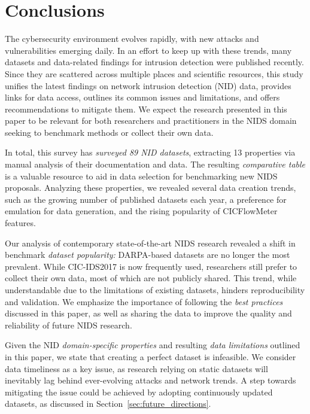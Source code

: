 
\section{Conclusions}
\label{sec:conclusions}

The cybersecurity environment evolves rapidly, with new attacks and vulnerabilities emerging daily. In an effort to keep up with these trends, many datasets and data-related findings for intrusion detection were published recently. Since they are scattered across multiple places and scientific resources, this study unifies the latest findings on network intrusion detection (NID) data, provides links for data access, outlines its common issues and limitations, and offers recommendations to mitigate them. We expect the research presented in this paper to be relevant for both researchers and practitioners in the NIDS domain seeking to benchmark methods or collect their own data.

In total, this survey has \emph{surveyed 89 NID datasets}, extracting 13 properties via manual analysis of their documentation and data. The resulting \emph{comparative table} is a valuable resource to aid in data selection for benchmarking new NIDS proposals. Analyzing these properties, we revealed several data creation trends, such as the growing number of published datasets each year, a preference for emulation for data generation, and the rising popularity of CICFlowMeter features.

Our analysis of contemporary state-of-the-art NIDS research revealed a shift in benchmark \emph{dataset popularity:} DARPA-based datasets are no longer the most prevalent. While CIC-IDS2017 is now frequently used, researchers still prefer to collect their own data, most of which are not publicly shared. This trend, while understandable due to the limitations of existing datasets, hinders reproducibility and validation. We emphasize the importance of following the \emph{best practices} discussed in this paper, as well as sharing the data to improve the quality and reliability of future NIDS research.

Given the NID \emph{domain-specific properties} and resulting \emph{data limitations} outlined in this paper, we state that creating a perfect dataset is infeasible. We consider data timeliness as a key issue, as research relying on static datasets will inevitably lag behind ever-evolving attacks and network trends. A step towards mitigating the issue could be achieved by adopting continuously updated datasets, as discussed in Section~\ref{sec:future_directions}.

